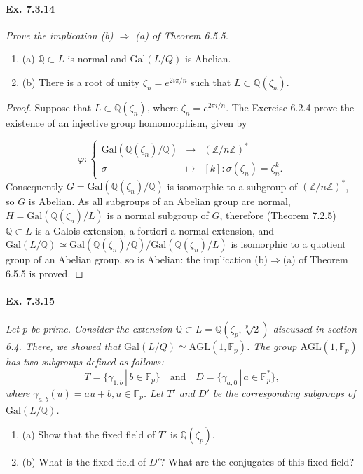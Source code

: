 \documentclass[11pt,a4paper]{article}
\newcommand{\be} {\begin{enumerate}}
\newcommand{\ee} {\end{enumerate}}
\newcommand{\Q}{\mathbb{Q}}
\newcommand{\Z}{\mathbb{Z}}
\newcommand{\F}{\mathbb{F}}
\newcommand{\Gal}{\mathrm{Gal}}
\begin{document}
\paragraph{Ex. 7.3.14}

{\it Prove the implication (b) $\Rightarrow$ (a) of Theorem 6.5.5.
\be
\item[(a)] $\Q\subset L$ is normal and $\Gal(L/Q)$ is Abelian.
\item[(b)] There is a root of unity $\zeta_n = e^{2i\pi/n}$ such that $L \subset \Q(\zeta_n)$.
\ee
}

\begin{proof}
Suppose that $L \subset \Q(\zeta_n)$, where $\zeta_n = e^{2\pi i/n}$.
The Exercise 6.2.4 prove the existence of an injective group homomorphism, given by

$$
\varphi : 
\left\{
\begin{array}{ccc}
 \Gal(\Q(\zeta_n)/\Q) & \to  &  (\Z/n\Z)^* \\
  \sigma&  \mapsto  &   [k] : \sigma(\zeta_n) = \zeta_n^k .
\end{array}
\right.
$$
Consequently $G =  \Gal(\Q(\zeta_n)/\Q)$ is isomorphic to a subgroup of  $(\Z/n\Z)^*$, so $G$ is Abelian. As all subgroups of an Abelian group are normal, $H = \Gal(\Q(\zeta_n)/L)$ is a normal subgroup of $G$, therefore (Theorem 7.2.5) $\Q \subset L$ is a Galois extension, a fortiori a normal extension, and $\Gal(L/\Q) \simeq \Gal(\Q(\zeta_n)/\Q) / \Gal(\Q(\zeta_n)/L)$ is isomorphic to a quotient group of an Abelian group, so is Abelian: the implication (b)$\Rightarrow$(a) of Theorem 6.5.5 is proved.
\end{proof}

\paragraph{Ex. 7.3.15}

{\it Let $p$ be prime. Consider the extension $\Q\subset L =\Q(\zeta_p,\sqrt[p]{2})$ discussed in section 6.4. There, we showed that $\Gal(L/Q) \simeq \mathrm{AGL}(1,\F_p)$. The group $\mathrm{AGL}(1,\F_p)$ has two subgroups defined as follows:
$$T = \{\gamma_{1,b}\, | \,b \in \F_p\} \quad \mathrm{and} \quad D = \{\gamma_{a,0}\, | \,a \in \F_p^*\},$$
where $\gamma_{a,b}(u) = au+b, u \in \F_p$. Let $T'$ and $D'$ be the corresponding subgroups of $\Gal(L/\Q)$.
\be
\item[(a)] Show that the fixed field of $T'$ is $\Q(\zeta_p)$.
\item[(b)] What is the fixed field of $D'$? What are the conjugates of this fixed field?
\ee
}
\end{document}
